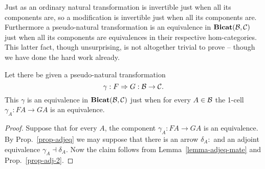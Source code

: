 \documentclass{robinthesisdraft}
\begin{document}
Just as an ordinary natural transformation is invertible just when all its
components are, so a modification is invertible just when all its components
are. Furthermore a pseudo-natural transformation is an equivalence
in $\mathbf{Bicat}(\mathcal{B},\mathcal{C})$ just when all its components are equivalences in
their respective hom-categories. This latter fact, though unsurprising,
is not altogether trivial to prove -- though we have done the hard work
already.
\begin{propn}\label{prop-pneq}
	Let there be given a pseudo-natural transformation
	\[
		\gamma: F\Rightarrow G: \mathcal{B}\to\mathcal{C}.
	\]
	This $\gamma$ is an equivalence in $\mathbf{Bicat}(\mathcal{B},\mathcal{C})$ just
	when for every $A\in\mathcal{B}$ the 1-cell $\gamma_A: FA\to GA$
	is an equivalence.
\end{propn}
\begin{proof}
	Suppose that for every $A$, the component $\gamma_A: FA\to GA$
	is an equivalence. By Prop.~\ref{prop-adjeq} we may suppose that
	there is an arrow $\delta_A: $ and an adjoint equivalence
	$\gamma_A\dashv\delta_A$. Now the claim follows from
	Lemma~\ref{lemma-adjeq-mate} and Prop.~\ref{prop-adj-2}.
\end{proof}
\end{document}
